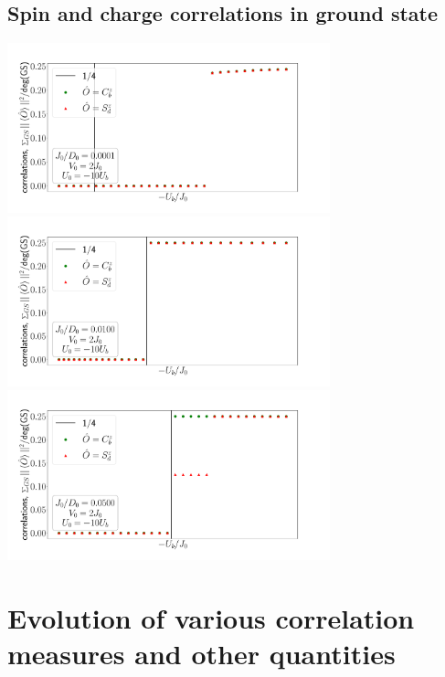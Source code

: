 \subsection*{Spin and charge correlations in ground state}
\begin{center}
	\includegraphics[width=0.7\textwidth]{../figures/corrs_gs-J=0.100.pdf}\\
	\includegraphics[width=0.7\textwidth]{../figures/corrs_gs-J=10.000.pdf}\\
	\includegraphics[width=0.7\textwidth]{../figures/corrs_gs-J=50.000.pdf}
\end{center}


\section{Evolution of various correlation measures and other quantities}

